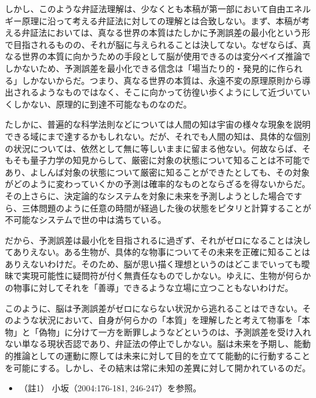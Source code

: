 しかし、このような\mbox{弁証法}理解は、少なくとも本稿が第一部において\mbox{自由エネルギー原理}に沿って考える\mbox{弁証法}に対しての理解とは合致しない。まず、本稿が考える\mbox{弁証法}においては、真なる世界の本質はたしかに\mbox{予測誤差}の最小化という形で目指されるものの、それが脳に与えられることは決してない。なぜならば、真なる世界の本質に向かうための手段として脳が使用できるのは変分ベイズ推論でしかないため、\mbox{予測誤差}を最小化できる信念は「場当たり的・発見的に作られる」しかないからだ。つまり、真なる世界の本質は、永遠不変の原理原則から導出されるようなものではなく、そこに向かって彷徨い歩くようにして近づいていくしかない、原理的に到達不可能なものなのだ。

たしかに、普遍的な科学法則などについては人間の知は宇宙の様々な現象を説明できる域にまで達するかもしれない。だが、それでも人間の知は、具体的な個別の状況については、依然として無に等しいままに留まる他ない。何故ならば、そもそも量子力学の知見からして、厳密に対象の状態について知ることは不可能であり、よしんば対象の状態について厳密に知ることができたとしても、その対象がどのように変わっていくかの予測は確率的なものとならざるを得ないからだ。その上さらに、決定論的なシステムを対象に未来を予測しようとした場合ですら、三体問題のように任意の時間が経過した後の状態をピタリと計算することが不可能なシステムで世の中は満ちている。

だから、\mbox{予測誤差}は最小化を目指されるに過ぎず、それがゼロになることは決してありえない。ある生物が、具体的な物事についてその未来を正確に知ることはありえないわけだ。そのため、脳が思い描く理想というのはどこまでいっても曖昧で実現可能性に疑問符が付く無責任なものでしかない。ゆえに、生物が何らかの物事に対してそれを「善導」できるような立場に立つこともないわけだ。

このように、脳は\mbox{予測誤差}がゼロにならない状況から逃れることはできない。そのような状況において、自身が何らかの「本質」を理解したと考えて物事を「本物」と「偽物」に分けて一方を断罪しようなどというのは、\mbox{予測誤差}を受け入れない単なる現状否認であり、\mbox{弁証法}の停止でしかない。脳は未来を予期し、能動的推論としての運動に際しては未来に対して目的を立てて能動的に行動することを可能にする。しかし、その結末は常に未知の差異に対して開かれているのだ。

\begin{itemize}
\tightlist
\item
  （註1） 小坂（2004:176-181, 246-247）\cite{Kosaka}を参照。
\end{itemize}

